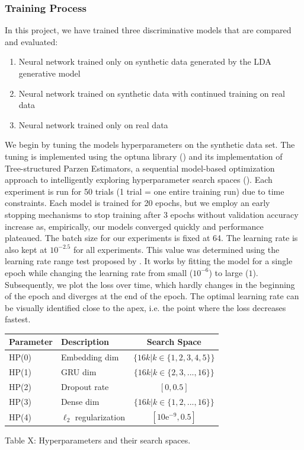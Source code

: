 \documentclass[11pt]{article}
\begin{document}
\subsubsection{Training Process}
In this project, we have trained three discriminative models that are compared and evaluated:
\begin{enumerate}
\itemsep0pt
  \item Neural network trained only on synthetic data generated by the LDA generative model
  \item Neural network trained on synthetic data with continued training on real data
  \item Neural network trained only on real data
\end{enumerate}



\noindent We begin by tuning the models hyperparameters on the synthetic data set. The tuning is implemented using the optuna library (\cite{optunapaper}) and its implementation of Tree-structured Parzen Estimators, a sequential model-based optimization approach to intelligently exploring hyperparameter search spaces (\cite{bergstraTPE}). Each experiment is run for 50 trials (1 trial = one entire training run) due to time constraints. Each model is trained for 20 epochs, but we employ an early stopping mechanisms to stop training after 3 epochs without validation accuracy increase as, empirically, our models converged quickly and performance plateaued. The batch size for our experiments is fixed at 64. The learning rate is also kept at $10^{-2.5}$ for all experiments. This value was determined using the learning rate range test proposed by \cite{smith2018disciplined}. It works by fitting the model for a single epoch while changing the learning rate from small ($10^{-6}$) to large ($1$). Subsequently, we plot the loss over time, which hardly changes in the beginning of the epoch and diverges at the end of the epoch. The optimal learning rate can be visually identified close to the apex, i.e. the point where the loss decreases fastest.

\begin{center}
\begin{tabular}{llc}
\toprule
    Parameter & Description & Search Space \\
\midrule
    HP(0) & Embedding dim & $\{16k \vert k\in \{1, 2, 3, 4, 5\}\}$\\
    HP(1) & GRU dim & $\{16k \vert k \in \{2, 3, ..., 16\}\}$\\
    HP(2) & Dropout rate & $[0, 0.5]$\\
    HP(3) & Dense dim &  $\{16k \vert k \in \{1, 2, ..., 16\}\}$\\
    HP(4) & $\ell_2$ regularization & $[10\mathrm{e}^{-9}, 0.5]$ \\
\bottomrule
\end{tabular}
\end{center}
\begin{center}
	Table X: Hyperparameters and their search spaces.
\end{center}
\end{document}
